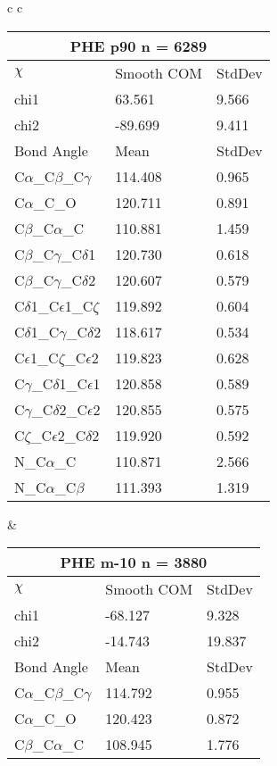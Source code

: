\begin{longtable}{ c c }

  \begin{tabular}{ l l l }
  \toprule
  \multicolumn{3}{c}{PHE \textbf{p90} n = 6289} \\ \toprule
  $\chi$       & Smooth COM & StdDev \\ \midrule
  chi1 & 63.561 & 9.566 \\ 
  chi2 & -89.699 & 9.411 \\ \midrule
  Bond Angle   & Mean     & StdDev \\ \midrule
  C$\alpha$\_C$\beta$\_C$\gamma$ & 114.408 & 0.965\\
  C$\alpha$\_C\_O & 120.711 & 0.891\\
  C$\beta$\_C$\alpha$\_C & 110.881 & 1.459\\
  C$\beta$\_C$\gamma$\_C$\delta$1 & 120.730 & 0.618\\
  C$\beta$\_C$\gamma$\_C$\delta$2 & 120.607 & 0.579\\
  C$\delta$1\_C$\epsilon$1\_C$\zeta$ & 119.892 & 0.604\\
  C$\delta$1\_C$\gamma$\_C$\delta$2 & 118.617 & 0.534\\
  C$\epsilon$1\_C$\zeta$\_C$\epsilon$2 & 119.823 & 0.628\\
  C$\gamma$\_C$\delta$1\_C$\epsilon$1 & 120.858 & 0.589\\
  C$\gamma$\_C$\delta$2\_C$\epsilon$2 & 120.855 & 0.575\\
  C$\zeta$\_C$\epsilon$2\_C$\delta$2 & 119.920 & 0.592\\
  N\_C$\alpha$\_C & 110.871 & 2.566\\
  N\_C$\alpha$\_C$\beta$ & 111.393 & 1.319\\
  \bottomrule
  \end{tabular}
  &
  \begin{tabular}{ l l l }
  \toprule
  \multicolumn{3}{c}{PHE \textbf{m-10} n = 3880} \\ \toprule
  $\chi$       & Smooth COM & StdDev \\ \midrule
  chi1 & -68.127 & 9.328 \\ 
  chi2 & -14.743 & 19.837 \\ \midrule
  Bond Angle   & Mean     & StdDev \\ \midrule
  C$\alpha$\_C$\beta$\_C$\gamma$ & 114.792 & 0.955\\
  C$\alpha$\_C\_O & 120.423 & 0.872\\
  C$\beta$\_C$\alpha$\_C & 108.945 & 1.776\\

\end{tabular}
\end{longtable}

